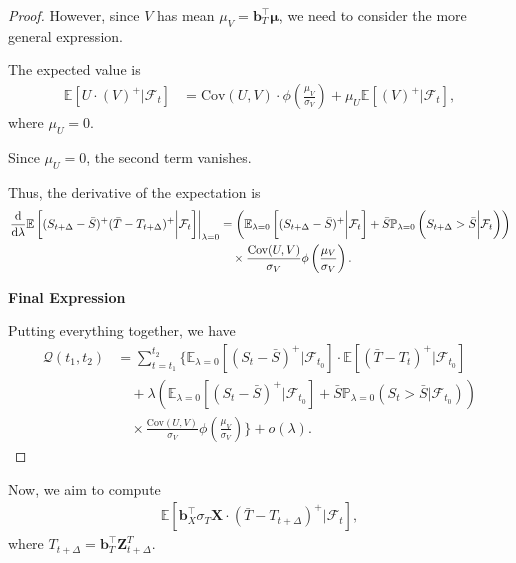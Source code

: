 \documentclass[10pt,a4paper,reqno]{amsart}
\theoremstyle{example}
\newcommand{\Cov}{\mathrm{Cov}}
\newcommand*\D{\mathop{}\!\textnormal{d}}
\begin{document}
\begin{proof}
However, since $V$ has mean $\mu_V = \mathbf{b}_T^\intercal \boldsymbol{\mu}$, we need to consider the more general expression.

The expected value is
\begin{align}
\mathbb{E} \left[ U \cdot (V)^+ \bigg| \mathcal{F}_t \right] &= \Cov(U, V) \cdot \phi\left( \frac{\mu_V}{\sigma_V} \right) + \mu_U \mathbb{E} \left[ (V)^+ \bigg| \mathcal{F}_t \right],
\end{align}
where $\mu_U = 0$.

Since $\mu_U = 0$, the second term vanishes.

Thus, the derivative of the expectation is
\begin{align}
\left. \frac{\D}{\D \lambda} \mathbb{E}\left[ (S_{t+\Delta} - \bar{S})^+ (\bar{T} - T_{t+\Delta})^+ \bigg| \mathcal{F}_t \right] \right|_{\lambda = 0} &= \left( \mathbb{E}_{\lambda = 0} \left[ (S_{t+\Delta} - \bar{S})^+ \bigg| \mathcal{F}_t \right] + \bar{S} \mathbb{P}_{\lambda = 0} \left( S_{t+\Delta} > \bar{S} \bigg| \mathcal{F}_t \right) \right) \nonumber \\
&\quad \times \frac{\Cov(U, V)}{\sigma_V} \phi\left( \frac{\mu_V}{\sigma_V} \right).
\end{align}

\textbf{Final Expression}

Putting everything together, we have
\begin{align}
\mathcal{Q}(t_1, t_2) &= \sum_{t = t_1}^{t_2} \Bigg\{ \mathbb{E}_{\lambda = 0} \left[ (S_t - \bar{S})^+ \bigg| \mathcal{F}_{t_0} \right] \cdot \mathbb{E} \left[ (\bar{T} - T_t)^+ \bigg| \mathcal{F}_{t_0} \right] \nonumber \\
&\quad + \lambda \left( \mathbb{E}_{\lambda = 0} \left[ (S_t - \bar{S})^+ \bigg| \mathcal{F}_{t_0} \right] + \bar{S} \mathbb{P}_{\lambda = 0} \left( S_t > \bar{S} \bigg| \mathcal{F}_{t_0} \right) \right) \nonumber \\
&\quad \times \frac{\Cov(U, V)}{\sigma_V} \phi\left( \frac{\mu_V}{\sigma_V} \right) \Bigg\} + o(\lambda).
\end{align}
\end{proof}



Now, we aim to compute
\begin{align}
\mathbb{E}\left[ \mathbf{b}_X^\intercal \sigma_T \mathbf{X} \cdot (\bar{T} - T_{t+\Delta})^+ \Bigg| \mathcal{F}_t \right],
\end{align}
where $T_{t+\Delta} = \mathbf{b}_T^\intercal \mathbf{Z}_{t+\Delta}^T$.
\end{document}

